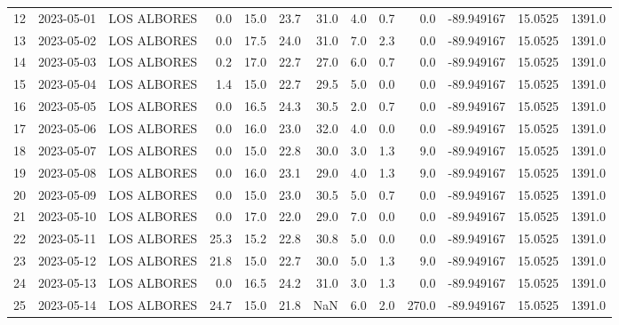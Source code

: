 \documentclass[12pt]{article}
\begin{document}
\begin{center}
\begin{tabular}{lllrrrrrrrrrr}
12  & 2023-05-01 &  LOS ALBORES &     0.0 &  15.0 &   23.7 &  31.0 &  4.0 &         0.7 &         0.0 & -89.949167 &  15.0525 &   1391.0 \\
13  & 2023-05-02 &  LOS ALBORES &     0.0 &  17.5 &   24.0 &  31.0 &  7.0 &         2.3 &         0.0 & -89.949167 &  15.0525 &   1391.0 \\
14  & 2023-05-03 &  LOS ALBORES &     0.2 &  17.0 &   22.7 &  27.0 &  6.0 &         0.7 &         0.0 & -89.949167 &  15.0525 &   1391.0 \\
15  & 2023-05-04 &  LOS ALBORES &     1.4 &  15.0 &   22.7 &  29.5 &  5.0 &         0.0 &         0.0 & -89.949167 &  15.0525 &   1391.0 \\
16  & 2023-05-05 &  LOS ALBORES &     0.0 &  16.5 &   24.3 &  30.5 &  2.0 &         0.7 &         0.0 & -89.949167 &  15.0525 &   1391.0 \\
17  & 2023-05-06 &  LOS ALBORES &     0.0 &  16.0 &   23.0 &  32.0 &  4.0 &         0.0 &         0.0 & -89.949167 &  15.0525 &   1391.0 \\
18  & 2023-05-07 &  LOS ALBORES &     0.0 &  15.0 &   22.8 &  30.0 &  3.0 &         1.3 &         9.0 & -89.949167 &  15.0525 &   1391.0 \\
19  & 2023-05-08 &  LOS ALBORES &     0.0 &  16.0 &   23.1 &  29.0 &  4.0 &         1.3 &         9.0 & -89.949167 &  15.0525 &   1391.0 \\
20  & 2023-05-09 &  LOS ALBORES &     0.0 &  15.0 &   23.0 &  30.5 &  5.0 &         0.7 &         0.0 & -89.949167 &  15.0525 &   1391.0 \\
21  & 2023-05-10 &  LOS ALBORES &     0.0 &  17.0 &   22.0 &  29.0 &  7.0 &         0.0 &         0.0 & -89.949167 &  15.0525 &   1391.0 \\
22  & 2023-05-11 &  LOS ALBORES &    25.3 &  15.2 &   22.8 &  30.8 &  5.0 &         0.0 &         0.0 & -89.949167 &  15.0525 &   1391.0 \\
23  & 2023-05-12 &  LOS ALBORES &    21.8 &  15.0 &   22.7 &  30.0 &  5.0 &         1.3 &         9.0 & -89.949167 &  15.0525 &   1391.0 \\
24  & 2023-05-13 &  LOS ALBORES &     0.0 &  16.5 &   24.2 &  31.0 &  3.0 &         1.3 &         0.0 & -89.949167 &  15.0525 &   1391.0 \\
25  & 2023-05-14 &  LOS ALBORES &    24.7 &  15.0 &   21.8 &   NaN &  6.0 &         2.0 &       270.0 & -89.949167 &  15.0525 &   1391.0 \\
\bottomrule
\end{tabular}

        
        \end{center}
        
\end{document}
